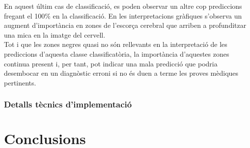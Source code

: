 \documentclass[a4paper,12pt]{article}
\begin{document}
En aquest últim cas de classificació, es poden observar un altre cop prediccions fregant el 100\% en la classificació. En les interpretacions gràfiques s'observa un augment d'importància en zones de l'escorça cerebral que arriben a profunditzar una mica en la imatge del cervell.\\
Tot i que les zones negres quasi no són rellevants en la interpretació de les prediccions d'aquesta classe classificatòria, la importància d'aquestes zones continua present i, per tant, pot indicar una mala predicció que podria desembocar en un diagnòstic erroni si no és duen a terme les proves mèdiques pertinents.
\subsubsection*{Detalls tècnics d'implementació}

\section*{Conclusions}
\end{document}
